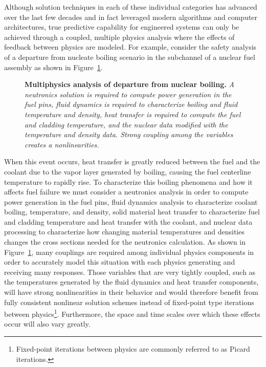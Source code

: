 Although solution techniques in each of these individual categories
has advanced over the last few decades and in fact leveraged modern
algorithms and computer architectures, true predictive capability for
engineered systems can only be achieved through a coupled, multiple
physics analysis where the effects of feedback between physics are
modeled. For example, consider the safety analysis of a departure from
nucleate boiling scenario in the subchannel of a nuclear fuel assembly
as shown in Figure~\ref{fig:dnb_example}.
\begin{figure}[htpb!]
  \begin{center}
    \scalebox{1.5}{
       }
  \end{center}
  \caption{\textbf{Multiphysics analysis of departure from nuclear
      boiling.} \textit{A neutronics solution is required to compute
      power generation in the fuel pins, fluid dynamics is required to
      characterize boiling and fluid temperature and density, heat
      transfer is required to compute the fuel and cladding
      temperature, and the nuclear data modified with the temperature
      and density data. Strong coupling among the variables creates a
      nonlinearities.}}
  \label{fig:dnb_example}
\end{figure}
When this event occurs, heat transfer is greatly reduced between the
fuel and the coolant due to the vapor layer generated by boiling,
causing the fuel centerline temperature to rapidly rise. To
characterize this boiling phenomena and how it affects fuel failure we
must consider a neutronics analysis in order to compute power
generation in the fuel pins, fluid dynamics analysis to characterize
coolant boiling, temperature, and density, solid material heat
transfer to characterize fuel and cladding temperature and heat
transfer with the coolant, and nuclear data processing to characterize
how changing material temperatures and densities changes the cross
sections needed for the neutronics calculation. As shown in
Figure~\ref{fig:dnb_example}, many couplings are required among
individual physics components in order to accurately model this
situation with each physics generating and receiving many
responses. Those variables that are very tightly coupled, such as the
temperatures generated by the fluid dynamics and heat transfer
components, will have strong nonlinearities in their behavior and
would therefore benefit from fully consistent nonlinear solution
schemes instead of fixed-point type iterations between
physics\footnote{Fixed-point iterations between physics are commonly
  referred to as Picard iterations.}. Furthermore, the space and time
scales over which these effects occur will also vary greatly.

